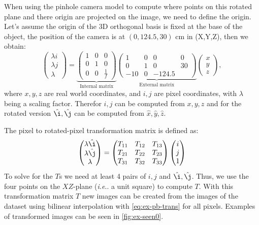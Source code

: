 \documentclass[runningheads]{llncs}
\makeatletter
\DeclareRobustCommand\onedot{\futurelet\@let@token\@onedot}
\def\@onedot{\ifx\@let@token.\else.\null\fi\xspace}
\def\ie{\emph{i.e}\onedot} \def\Ie{\emph{I.e}\onedot}
\makeatother
\begin{document}
\begin{appendix}
When using the pinhole camera model to compute where points on this rotated plane and there origin are projected on the image, we need to define the origin.
Let's assume the origin of the 3D orthogonal basis is fixed at the base of the object, the position of the camera is at $(0,124.5,30)$ cm in (X,Y,Z), then we obtain:
\begin{equation} \label{eq:ex-bp-phole}
\begin{pmatrix} \lambda i \\ \lambda j \\ \lambda \end{pmatrix} =
\underbrace{\begin{pmatrix} 1 & 0 & 0 \\ 0 & 1 & 0 \\ 0 & 0 & \frac1f \end{pmatrix}}_\text{Internal matrix}
\underbrace{\begin{pmatrix} 1 & 0 & 0 & 0\\ 0 & 1 & 0 & 30\\ -1 0 & 0 & -124.5 \end{pmatrix}}_\text{External matrix}
\begin{pmatrix} x\\y\\z \end{pmatrix},
\end{equation}
where $x,y,z$ are real world coordinates, and $i,j$ are pixel coordinates, with $\lambda$ being a scaling factor.
Therefor $i,j$ can be computed from $x,y,z$ and for the rotated version $\hat{\i},\hat{\j}$ can be computed from $\hat{x},\hat{y},\hat{z}$.

The pixel to rotated-pixel transformation matrix is defined as:
\begin{equation} \label{eq:ex-pb-trans}
\begin{pmatrix} \lambda \hat{\i} \\ \lambda \hat{\j} \\ \lambda \end{pmatrix} =
\begin{pmatrix} T_{11} & T_{12} & T_{13} \\ T_{21} & T_{22} & T_{23} \\ T_{31} & T_{32} & T_{33} \end{pmatrix}
\begin{pmatrix} i \\ j \\ 1 \end{pmatrix}
\end{equation}
To solve for the $T$s we need at least 4 pairs of $i,j$ and $\hat{\i},\hat{\j}$. 
Thus, we use the four points on the $XZ$-plane (\ie a unit square) to compute $T$.
With this transformation matrix $T$ new images can be created from the images of the dataset using bilinear interpolation with \autoref{eq:ex-pb-trans} for all pixels.
Examples of transformed images can be seen in \autoref{fig:ex-seen0}.


\end{appendix}
\end{document}
